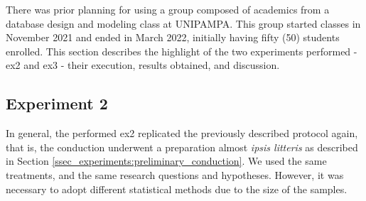 There was prior planning for using a group composed of academics from a database design and modeling class at UNIPAMPA.
This group started classes in November 2021 and ended in March 2022, initially having fifty (50) students enrolled.
This section describes the highlight of the two experiments performed - \ac{ex2} and \ac{ex3} - their execution, results obtained, and discussion.

\subsection{Experiment 2}
\label{ssec_experiments:Experiment2}

In general, the performed \ac{ex2} replicated the previously described protocol again, that is, the conduction underwent a preparation almost \textit{ipsis litteris} as described in Section \ref{ssec_experiments:preliminary_conduction}.
We used the same treatments, and the same research questions and hypotheses.
However, it was necessary to adopt different statistical methods due to the size of the samples.

